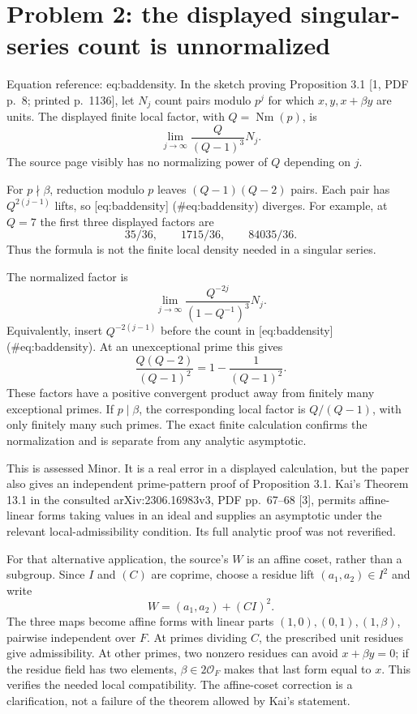\documentclass[10pt]{article}
\begin{document}
\section*{Problem 2: the displayed singular-series count is unnormalized}
Equation reference: eq:baddensity. In the sketch proving Proposition 3.1 [1, PDF p. 8; printed p. 1136], let \(N_j\) count pairs modulo \(p^j\) for which \(x,y,x+\beta y\) are units. The displayed finite local factor, with \(Q=\operatorname{Nm}( p)\), is \[
 \lim_{j\to\infty}\frac{Q}{(Q-1)^3}
 N_j.\] The source page visibly has no normalizing power of \(Q\) depending on \(j\).\par
For \(p\nmid\beta\), reduction modulo \(p\) leaves \((Q-1)(Q-2)\) pairs. Each pair has \(Q^{2(j-1)}\) lifts, so [eq:baddensity] (\#eq:baddensity) diverges. For example, at \(Q=7\) the first three displayed factors are \[35/36,\qquad1715/36,\qquad84035/36 .\] Thus the formula is not the finite local density needed in a singular series.\par
The normalized factor is \[\lim_{j\to\infty}
 \frac{Q^{-2j}}{(1-Q^{-1})^3}
 N_j.\] Equivalently, insert \(Q^{-2(j-1)}\) before the count in [eq:baddensity] (\#eq:baddensity). At an unexceptional prime this gives \[\frac{Q(Q-2)}{(Q-1)^2}=1-\frac1{(Q-1)^2}.\] These factors have a positive convergent product away from finitely many exceptional primes. If \(p\mid\beta\), the corresponding local factor is \(Q/(Q-1)\), with only finitely many such primes. The exact finite calculation confirms the normalization and is separate from any analytic asymptotic.\par
This is assessed Minor. It is a real error in a displayed calculation, but the paper also gives an independent prime-pattern proof of Proposition 3.1. Kai’s Theorem 13.1 in the consulted arXiv:2306.16983v3, PDF pp. 67–68 [3], permits affine-linear forms taking values in an ideal and supplies an asymptotic under the relevant local-admissibility condition. Its full analytic proof was not reverified.\par
For that alternative application, the source’s \(W\) is an affine coset, rather than a subgroup. Since \(I\) and \((C)\) are coprime, choose a residue lift \((a_1,a_2)\in I^2\) and write \[W=(a_1,a_2)+(CI)^2.\] The three maps become affine forms with linear parts \((1,0),(0,1),(1,\beta)\), pairwise independent over \(F\). At primes dividing \(C\), the prescribed unit residues give admissibility. At other primes, two nonzero residues can avoid \(x+\beta y=0\); if the residue field has two elements, \(\beta\in2\mathcal O_F\) makes that last form equal to \(x\). This verifies the needed local compatibility. The affine-coset correction is a clarification, not a failure of the theorem allowed by Kai’s statement.\par
\end{document}
